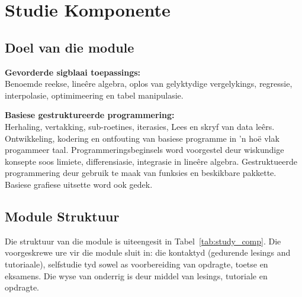 \section{Studie Komponente}
    \subsection{Doel van die module}
        {\bf Gevorderde sigblaai toepassings:} \\ Benoemde reekse, line\^{e}re
        algebra, oplos van gelyktydige vergelykings, regressie, interpolasie,
        optimimeering en tabel manipulasie.

        {\bf Basiese gestruktureerde programmering:} \\ Herhaling, vertakking,
        sub-roetines, iterasies, Lees en skryf van data le\^{e}rs.
        Ontwikkeling, kodering en ontfouting van basiese programme in 'n
        ho\"{e} vlak progammeer taal. Programmeringsbeginsels word voorgestel
        deur wiskundige konsepte soos limiete, differensiasie, integrasie in
        line\^{e}re algebra.  Gestruktueerde programmering deur gebruik te maak
        van funksies en beskikbare pakkette.  Basiese grafiese uitsette word
        ook gedek.

    \subsection{Module Struktuur}
        Die struktuur van die module is uiteengesit in
        Tabel~\ref{tab:study_comp}.  Die voorgeskrewe ure vir die module sluit
        in: die kontaktyd (gedurende lesings and tutoriaale), selfstudie tyd
        sowel as voorbereiding van opdragte, toetse en eksamens. Die wyse van
        onderrig is deur middel van lesings, tutoriale en opdragte.

